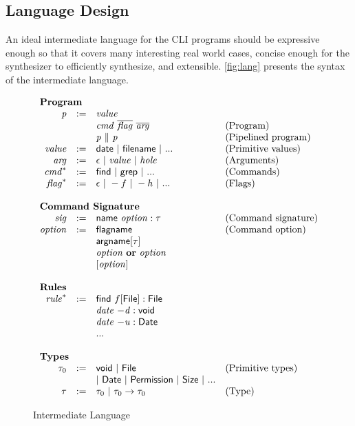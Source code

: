 \subsection{Language Design}
\label{subsec:represent}
An ideal intermediate language for the CLI programs should be expressive enough so that it covers many interesting real world cases, concise enough for the synthesizer to efficiently synthesize, and extensible. \autoref{fig:lang} presents the syntax of the intermediate language.

\begin{figure}
\[
\begin{array}{rlll}
\multicolumn{3}{l}{\textbf{Program}}\\
\mathit{p} & := & \mathit{value} \\
    &  & \mathit{cmd}~\overline{\mathit{flag}}~\overline{\mathit{arg}} & \textrm{(Program)}\\
    &  & \mathit{p} ~\| ~\mathit{p} & \textrm{(Pipelined program)}\\
\mathit{value} & := & \mathsf{date} ~|~ \mathsf{filename} ~|~ ... & \textrm{(Primitive values)}\\
\mathit{arg} & := & \epsilon ~|~ \mathit{value} ~|~ \mathit{hole} & \textrm{(Arguments)}\\
\mathit{cmd}^{*} & := & \mathsf{find} ~|~ \mathsf{grep} ~|~ ... & \textrm{(Commands)}\\
\mathit{flag}^{*} & := & \epsilon ~|~ -f ~|~ -h ~|~ ... & \textrm{(Flags)}\\
~\\
\multicolumn{3}{l}{\textbf{Command Signature}}\\
\mathit{sig} & := & \mathsf{name}~\mathit{option}:\tau & \textrm{(Command signature)}\\
\mathit{option} &:= & \mathsf{flagname} & \textrm{(Command option)}\\
                &   & \mathsf{argname}[\tau]\\
                &   & \mathit{option}~\mathbf{or}~\mathit{option}\\
                &   & [ \mathit{option} ]\\
~\\
\multicolumn{3}{l}{\textbf{Rules}}\\
\mathit{rule}^{*} &:=& \mathsf{find}~f[\mathsf{File}] : \mathsf{File}\\
                  &  & \mathit{date}~\mathit{-d} : \mathsf{void}\\
                  &  & \mathit{date}~\mathit{-u} : \mathsf{Date}\\
                  &  & ...\\
~\\
\multicolumn{3}{l}{\textbf{Types}}\\
\tau_0 & := & \mathsf{void} ~|~ \mathsf{File} & \textrm{(Primitive types)}\\
       &     & |~ \mathsf{Date} ~|~ \mathsf{Permission} ~|~ \mathsf{Size} ~|~ ... \\
\tau & := & \tau_0 ~|~ \tau_0\rightarrow \tau_0 & \textrm{(Type)}
\end{array}
\]
\caption{Intermediate Language}
\label{fig:lang}
\end{figure}


